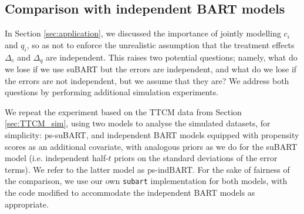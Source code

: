 \documentclass[aoas,preprint]{imsart}
\theoremstyle{plain}
\theoremstyle{definition}
\theoremstyle{remark}
\begin{document}
\renewcommand\thesubsection{\Alph{section}.\arabic{subsection}}
\renewcommand\thefigure{\thesection.\arabic{figure}}
\renewcommand\thetable{\thesection.\arabic{table}}


\begin{appendix}


\section{Comparison with independent BART models}
\setcounter{figure}{0}
\setcounter{table}{0}
\label{app:indBART}
 
In Section \ref{sec:application}, we discussed the importance of jointly modelling $c_i$ and $q_i$, so as not to enforce the unrealistic assumption that the treatment effects $\Delta_c$ and $\Delta_q$ are independent. This raises two potential questions; namely, what do we lose if we use suBART but the errors are independent, and what do we lose if the errors are not independent, but we assume that they are? We address both questions by performing additional simulation experiments. 

We repeat the experiment based on the TTCM data from Section \ref{sec:TTCM_sim}, using two models to analyse the simulated datasets, for simplicity: ps-suBART, and independent BART models equipped with propensity scores as an additional covariate, with analogous priors as we do for the suBART model (i.e. independent half-$t$ priors on the standard deviations of the error terms). We refer to the latter model as ps-indBART. For the sake of fairness of the comparison, we use our own \texttt{subart} implementation for both models, with the code modified to accommodate the independent BART models as appropriate. 


\end{appendix}
\end{document}
